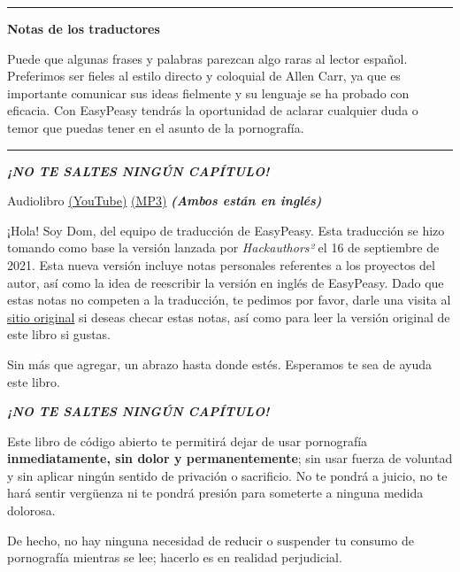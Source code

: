 \documentclass[
  spanish,
  openany]{book}
\let\oldhref\href
\renewcommand{\href}[2]{\textcolor{blue}{\oldhref{#1}{#2}}}
\begin{document}
\begin{center}\rule{0.5\linewidth}{0.5pt}\end{center}

\textbf{Notas de los traductores}

Puede que algunas frases y palabras parezcan algo raras al lector español. Preferimos ser fieles al estilo directo y coloquial de Allen Carr, ya que es importante comunicar sus ideas fielmente y su lenguaje se ha probado con eficacia. Con EasyPeasy tendrás la oportunidad de aclarar cualquier duda o temor que puedas tener en el asunto de la pornografía.

\begin{center}\rule{0.5\linewidth}{0.5pt}\end{center}

{\emph{\textbf{¡NO TE SALTES NINGÚN CAPÍTULO!}}}

Audiolibro \href{https://www.youtube.com/watch?v=ZktxO6adTnI}{(YouTube)} \href{https://onedrive.live.com/?authkey=\%21AKIwfnK6Sjchng8\&cid=3961F5C89581C375\&id=3961F5C89581C375\%21256774\&parId=3961F5C89581C375\%21256773\&o=OneUp\&sw=bypassConfig}{(MP3)} \emph{\textbf{(Ambos están en inglés)}}

¡Hola! Soy Dom, del equipo de traducción de EasyPeasy. Esta traducción se hizo tomando como base la versión lanzada por \emph{Hackauthors²} el 16 de septiembre de 2021. Esta nueva versión incluye notas personales referentes a los proyectos del autor, así como la idea de reescribir la versión en inglés de EasyPeasy. Dado que estas notas no competen a la traducción, te pedimos por favor, darle una visita al \href{https://easypeasymethod.org/}{sitio original} si deseas checar estas notas, así como para leer la versión original de este libro si gustas.

Sin más que agregar, un abrazo hasta donde estés. Esperamos te sea de ayuda este libro.

{\emph{\textbf{¡NO TE SALTES NINGÚN CAPÍTULO!}}}

Este libro de código abierto te permitirá dejar de usar pornografía \textbf{inmediatamente, sin dolor y permanentemente}; sin usar fuerza de voluntad y sin aplicar ningún sentido de privación o sacrificio. No te pondrá a juicio, no te hará sentir vergüenza ni te pondrá presión para someterte a ninguna medida dolorosa.

De hecho, no hay ninguna necesidad de reducir o suspender tu consumo de pornografía mientras se lee; hacerlo es en realidad perjudicial.
\end{document}
